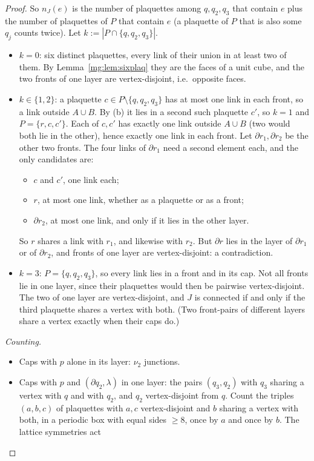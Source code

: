 \documentclass[11pt,a4paper]{article}
\theoremstyle{definition}
\theoremstyle{remark}
\begin{document}
\begin{proof}
So $n_J(e)$ is the number of plaquettes among $q,q_2,q_3$ that contain $e$ plus the number of plaquettes of $P$ that contain $e$ (a plaquette of $P$ that is also some $q_j$ counts
twice). Let $k:=|P\cap\{q,q_2,q_3\}|$.
\begin{itemize}
\item $k=0$: six distinct plaquettes, every link of their union in at least two of them. By Lemma~\ref{mg:lem:sixplaq} they are the faces of a unit cube, and the two fronts of one layer are
vertex-disjoint, i.e.\ opposite faces.
\item $k\in\{1,2\}$: a plaquette $c\in P\setminus\{q,q_2,q_3\}$ has at most one link in each front, so a link outside $A\cup B$. By (b) it lies in a second such plaquette $c'$, so $k=1$ and
$P=\{r,c,c'\}$. Each of $c,c'$ has exactly one link outside $A\cup B$ (two would both lie in the other), hence exactly one link in each front. Let $\partial r_1,\partial r_2$ be the
other two fronts. The four links of $\partial r_1$ need a second element each, and the only candidates are:
\begin{itemize}
\item $c$ and $c'$, one link each;
\item $r$, at most one link, whether as a plaquette or as a front;
\item $\partial r_2$, at most one link, and only if it lies in the other layer.
\end{itemize}
So $r$ shares a link with $r_1$, and likewise with $r_2$. But $\partial r$ lies in the layer of $\partial r_1$ or of $\partial r_2$, and fronts of one layer are vertex-disjoint: a
contradiction.
\item $k=3$: $P=\{q,q_2,q_3\}$, so every link lies in a front and in its cap. Not all fronts lie in one layer, since their plaquettes would then be pairwise vertex-disjoint. The two of one
layer are vertex-disjoint, and $J$ is connected if and only if the third plaquette shares a vertex with both. (Two front-pairs of different layers share a vertex exactly when their caps do.)
\end{itemize}
\emph{Counting.}
\begin{itemize}
\item Caps with $p$ alone in its layer: $\nu_2$ junctions.
\item Caps with $p$ and $(\partial q_2,\lambda)$ in one layer: the pairs $(q_3,q_2)$ with $q_3$ sharing a vertex with $q$ and with $q_2$, and $q_2$ vertex-disjoint from $q$. Count the triples
$(a,b,c)$ of plaquettes with $a,c$ vertex-disjoint and $b$ sharing a vertex with both, in a periodic box with equal sides $\ge8$, once by $a$ and once by $b$. The lattice symmetries act

\end{itemize}
\end{proof}
\end{document}
